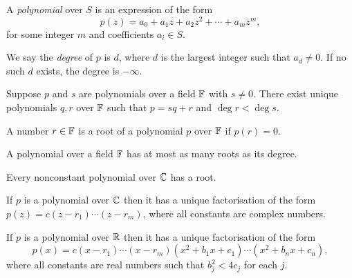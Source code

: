   \begin{defn}
    A \emph{polynomial} over $S$ is an expression of the form
    \[p(z)=a_0+a_1z+a_2 z^2+\cdots+a_m z^m,\]
    for some integer $m$ and coefficients $a_i\in S$.

    We say the \emph{degree} of $p$ is $d$, where $d$ is the largest integer
    such that $a_d\ne 0$. If no such $d$ exists, the degree is $-\infty$.
  \end{defn}
  \begin{prop}
    Suppose $p$ and $s$ are polynomials over a field $\mathbb{F}$
    with $s\ne 0$. There exist unique
    polynomials $q,r$ over $\mathbb{F}$ such that $p=sq+r$ and $\deg r<\deg s$.
  \end{prop}
  \begin{defn}
    A number $r\in\mathbb{F}$ is a root of a polynomial $p$ over $\mathbb{F}$ if $p(r)=0$.
  \end{defn}
  \begin{prop}
    A polynomial over a field $\mathbb{F}$ has at most as many roots as its degree.
  \end{prop}
  \begin{thm}
    Every nonconstant polynomial over $\mathbb{C}$ has a root.
  \end{thm}
  \begin{prop}
    If $p$ is a polynomial over $\mathbb{C}$ then it has a unique factorisation of the
    form $p(z)=c(z-r_1)\cdots(z-r_m)$, where all constants are complex numbers.
  \end{prop}
  \begin{prop}
    If $p$ is a polynomial over $\mathbb{R}$ then it has a unique factorisation of the
    form
    \[p(x)=c(x-r_1)\cdots(x-r_m)(x^2+b_1x+c_1)\cdots(x^2+b_n x+c_n),\]
    where all constants are real numbers such that $b_j^2<4c_j$ for each $j$.
  \end{prop}

